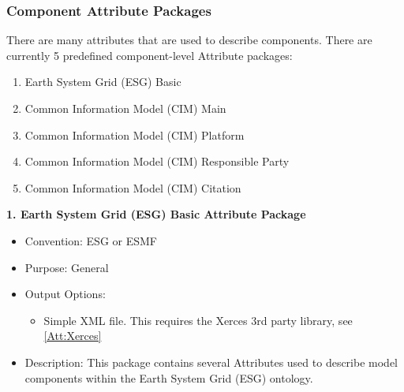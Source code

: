 \subsubsection{Component Attribute Packages}
\label{ComponentAttributePackages}

There are many attributes that are used to describe components. There are currently 5 predefined component-level Attribute packages:

\begin{enumerate}
    \item Earth System Grid (ESG) Basic
    \item Common Information Model (CIM) Main
    \item Common Information Model (CIM) Platform
    \item Common Information Model (CIM) Responsible Party
    \item Common Information Model (CIM) Citation
\end{enumerate}

\vspace{.20in}

{\bf 1. Earth System Grid (ESG) Basic Attribute Package}

\begin{itemize}
    \item Convention: ESG or ESMF
    \item Purpose: General
    \item Output Options:
    \begin{itemize}
        \item{Simple XML file. This requires the Xerces 3rd party library, see \ref{Att:Xerces}}
    \end{itemize} 
    \item Description: This package contains several Attributes used to describe model components within the Earth System Grid (ESG) ontology. 
\end{itemize}


